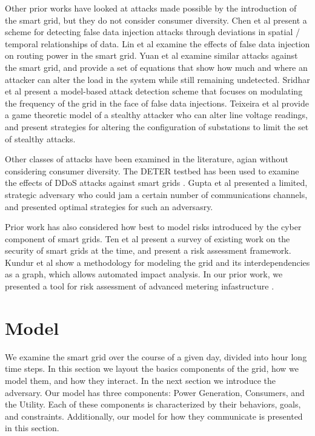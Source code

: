 \documentclass[conference]{IEEEtran}
\begin{document}
Other prior works have looked at attacks made possible by the introduction of the smart grid, but they do not consider consumer diversity.  Chen et al \cite{chen2015detection} present a scheme for detecting false data injection attacks through deviations in spatial / temporal relationships of data.  Lin et al \cite{lin2012false} examine the effects of false data injection on routing power in the smart grid.  Yuan et al \cite{yuan2011modeling} examine similar attacks against the smart grid, and provide a set of equations that show how much and where an attacker can alter the load in the system while still remaining undetected.  Sridhar et al \cite{sridhar2014model} present a model-based attack detection scheme that focuses on modulating the frequency of the grid in the face of false data injections.  Teixeira et al \cite{teixeira2014security} provide a game theoretic model of a stealthy attacker who can alter line voltage readings, and present strategies for altering the configuration of substations to limit the set of stealthy attacks.  

Other classes of attacks have been examined in the literature, agian without considering consumer diversity.  The DETER testbed has been used to examine the effects of DDoS attacks against smart grids \cite{hussain2012ncs}.  Gupta et al \cite{gupta2010optimal} presented a limited, strategic adversary who could jam a certain number of communications channels, and presented optimal strategies for such an adversasry.  

Prior work has also considered how best to model risks introduced by the cyber component of smart grids.  Ten et al \cite{ten2010cybersecurity} present a survey of existing work on the security of smart grids at the time, and present a risk assessment framework.  Kundur et al \cite{kundur2010towards} show a methodology for modeling the grid and its interdependencies as a graph, which allows automated impact analysis.  In our prior work, we presented a tool for risk assessment of advanced metering infastructure \cite{shawly2014risk}.

\section{Model}

We examine the smart grid over the course of a given day, divided into hour long time steps.  In this section we layout the basics components of the grid, how we model them, and how they interact.  In the next section we introduce the adversary.  Our model has three components: Power Generation, Consumers, and the Utility.  Each of these components is characterized by their behaviors, goals, and constraints.  Additionally, our model for how they communicate is presented in this section.  
\end{document}
